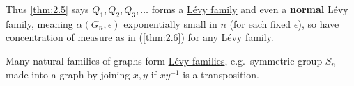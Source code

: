 \documentclass{article}
\newcommand{\named}[1]{\textbf{#1}\index{#1}}
\begin{document}

Thus \cref{thm:2.5} says $Q_1, Q_2, Q_3, \dotsc$ forms a \hyperlink{def:levyfam}{L\'evy family} and even a \textbf{normal} L\'evy family, meaning $\alpha(G_n, \epsilon)$ exponentially small in $n$ (for each fixed $\epsilon$), so have concentration of measure as in (\cref{thm:2.6}) for any \hyperlink{def:levyfam}{L\'evy family}.

Many natural families of graphs form \hyperlink{def:levyfam}{L\'evy families}, e.g.\ symmetric group $S_n$ - made into a graph by joining $x,y$ if $x y^{-1}$ is a transposition.
\end{document}
